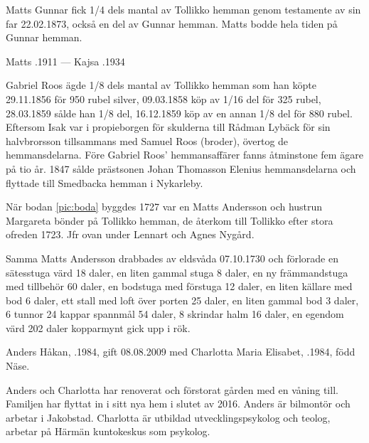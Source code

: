 %
Matts Gunnar fick 1/4 dels mantal av Tollikko hemman genom testamente av sin far 22.02.1873, också en del av Gunnar hemman. Matts bodde hela tiden på Gunnar hemman.

Matts .1911  --- 	Kajsa .1934


%
Gabriel Roos ägde 1/8 dels mantal av Tollikko hemman som han köpte 29.11.1856 för 950 rubel silver, 09.03.1858 köp av 1/16 del för 325 rubel, 28.03.1859 sålde han 1/8 del, 16.12.1859 köp av en annan 1/8 del för 880 rubel. Eftersom Isak var i propieborgen för skulderna till Rådman Lybäck för sin halvbrorsson tillsammans med Samuel Roos (broder), övertog de hemmansdelarna. Före Gabriel Roos' hemmansaffärer fanns åtminstone fem ägare på tio år. 1847 sålde prästsonen Johan Thomasson Elenius hemmansdelarna och flyttade till Smedbacka hemman i Nykarleby.

När bodan \ref{pic:boda} byggdes 1727 var en Matts Andersson och hustrun Margareta bönder på Tollikko hemman, de återkom till Tollikko efter stora ofreden 1723. Jfr ovan under Lennart och Agnes Nygård.

Samma Matts Andersson drabbades av eldsvåda 07.10.1730 och förlorade en sätesstuga värd 18 daler, en liten gammal stuga 8 daler, en ny främmandstuga med tillbehör 60 daler, en bodstuga med förstuga 12 daler, en liten källare med bod 6 daler, ett stall med loft över porten 25 daler, en liten gammal bod 3 daler, 6 tunnor 24 kappar spannmål 54 daler, 8 skrindar halm 16 daler, en egendom värd 202 daler kopparmynt gick upp i rök.



%



%
Anders Håkan, .1984, gift 08.08.2009 med Charlotta Maria Elisabet, .1984, född Näse.
\begin{jhchildren}
  \item {}
  \item {}
  \item {}
\end{jhchildren}
Anders och Charlotta har renoverat och förstorat gården med en våning till. Familjen har flyttat in i sitt nya hem i slutet av 2016. Anders är bilmontör och arbetar i Jakobstad. Charlotta är utbildad utvecklingspsykolog och teolog, arbetar på Härmän kuntokeskus som psykolog.


